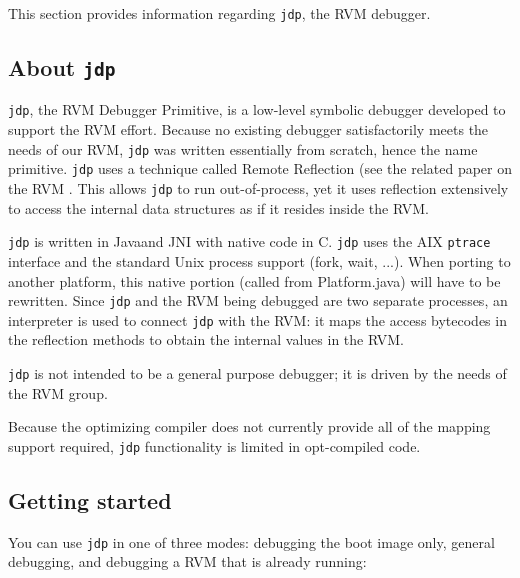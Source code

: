 This section provides information regarding {\tt jdp}, the RVM
debugger.

\subsection{About {\tt jdp}}

  {\tt jdp}, the RVM Debugger Primitive, is a low-level symbolic debugger 
developed to support the
RVM effort.  Because no existing debugger satisfactorily meets the
needs of our RVM, {\tt jdp} was written essentially from scratch, hence the
name primitive.  {\tt jdp} uses a technique called Remote
Reflection (see the related paper on the RVM 
.  This
allows {\tt jdp} to run out-of-process, yet it uses reflection extensively to
access the internal data structures as if it resides inside the RVM.

   {\tt jdp} is written in Java\trademark and JNI with native code in C.  {\tt jdp}
uses the
AIX {\tt ptrace} interface and the standard Unix process support (fork,
wait, ...).  When porting to another platform, this native portion
(called from Platform.java) will have to be rewritten.  Since {\tt jdp} and
the RVM being debugged are two separate processes, an interpreter is
used to connect {\tt jdp} with the RVM:  it maps the access bytecodes in the
reflection methods to obtain the internal values in the RVM.
  
  {\tt jdp} is not intended to be a general purpose debugger; it is driven
by the needs of the RVM group.  

   Because the optimizing compiler does not currently provide all of
   the mapping support required, {\tt jdp} functionality is limited in
   opt-compiled code. 

\subsection{Getting started}

   You can use {\tt jdp} in one of three modes: debugging the boot image only, 
general debugging, and debugging a RVM that is already running:

